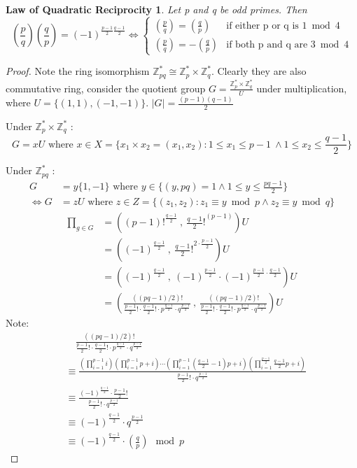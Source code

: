 \documentclass{article}
\newtheorem*{thm}{Law of Quadratic Reciprocity}
\begin{document}
	\begin{thm}
	 	Let p and q be odd primes. Then
	 	$$
	 	\left( \frac { p } { q } \right) \left( \frac { q } { p } \right) = ( - 1 ) ^ { \frac { p - 1 } { 2 } \frac { q - 1 } { 2 } }
	 	\iff
	 	\begin{cases}
	 		(\frac{p}{q})=(\frac{q}{p}) &\text{if either p or q is }1\bmod 4\\
	 		(\frac{p}{q})=-(\frac{q}{p}) &\text{if both p and q are }3\bmod 4
	 	\end{cases}
	 	$$ 	
	\end{thm}
	\begin{proof}
		Note the ring isomorphism $\mathbb{Z}_{pq}^{*} \cong \mathbb{Z}_{p}^* \times \mathbb{Z}_{q}^*$. Clearly they are also commutative ring, consider the quotient group $G=\frac{\mathbb{Z}_{p}^* \times \mathbb{Z}_{q}^*}{ U }$ under multiplication, where $U=\{ (1,1),(-1,-1) \}$. $|G|=\frac{(p-1)(q-1)}{2}$

		Under $\mathbb{Z}_{p}^* \times \mathbb{Z}_{q}^*$ :		
		$$G=xU \text{ where } x \in X=\{ x_1 \times x_2 = (x_1,x_2) : 1\leq x_1 \leq p-1\ \land 1\leq x_2 \leq \frac{q-1}{2} \}$$
		
		Under $\mathbb{Z}_{pq}^{*}$ :
		\begin{align*}
			G &= y\{ 1, -1 \} \text{ where } y \in \{ (y,pq)=1 \land 1\leq y \leq \frac{pq-1}{2} \} \\
		\iff G &= zU \text{ where } z\in Z=\{ (z_1,z_2) : z_1 \equiv y \bmod p \land z_2 \equiv y \bmod q \}
		\end{align*}
		\begin{align*}
			\prod_{g\in G} &= ({(p-1)!}^{\frac{q-1}{2}}\ , \ {\frac{q-1}{2}!}^{(p-1)})U\\
						   &= ((-1)^{\frac{q-1}{2}}\ , \ {\frac{q-1}{2} !}^{2 \cdot \frac{p-1}{2}})U\\
						   &= ((-1)^{\frac{q-1}{2}}\ , \ (-1)^{\frac{p-1}{2}}\cdot (-1)^{\frac{p-1}{2}\cdot \frac{q-1}{2}})U\\
						   &= (\frac{(({pq-1})/{2})!}{\frac{p-1}{2}!\cdot \frac{q-1}{2}!\cdot p^\frac{q -1}{2}\cdot q^\frac{p-1}{2}}\ , \ \frac{(({pq-1})/{2})!}{\frac{p-1}{2}!\cdot \frac{q-1}{2}!\cdot p^\frac{q -1}{2}\cdot q^\frac{p-1}{2}})U
		\end{align*}
		Note:	
		\begin{align*}
			&\quad \frac{(({pq-1})/{2})!}{\frac{p-1}{2}!\cdot \frac{q-1}{2}!\cdot p^\frac{q -1}{2}\cdot q^\frac{p-1}{2}}\\
			&\equiv \frac{\left( \prod _ { i = 1 } ^ { p - 1 } i \right) \left( \prod _ { i = 1 } ^ { p - 1 } p + i \right) \cdots \left( \prod _ { i = 1 } ^ { p - 1 } \left( \frac { q - 1 } { 2 } - 1 \right) p + i \right) \left( \prod _ { i = 1 } ^ { \frac { p - 1 } { 2 } } \frac { q - 1 } { 2 } p + i \right)}{\frac{p-1}{2}!\cdot q^\frac{p-1}{2}}\\
			&\equiv \frac{(-1)^{\frac{q-1}{2}}\cdot \frac{p-1}{2}!}{\frac{p-1}{2}!\cdot q^\frac{p-1}{2}}\\
			&\equiv (-1)^{\frac{q-1}{2}}\cdot q^\frac{p-1}{2} \\
			&\equiv (-1)^{\frac{q-1}{2}} \cdot (\frac{q}{p}) \mod p
		\end{align*}
		

\end{proof}
\end{document}
